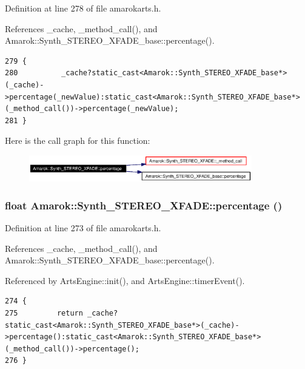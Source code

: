 Definition at line 278 of file amarokarts.h.

References \_\-cache, \_\-method\_\-call(), and Amarok::Synth\_\-STEREO\_\-XFADE\_\-base::percentage().



\footnotesize\begin{verbatim}279 {
280          _cache?static_cast<Amarok::Synth_STEREO_XFADE_base*>(_cache)->percentage(_newValue):static_cast<Amarok::Synth_STEREO_XFADE_base*>(_method_call())->percentage(_newValue);
281 }
\end{verbatim}\normalsize 


Here is the call graph for this function:\begin{figure}[H]
\begin{center}
\leavevmode
\includegraphics[width=275pt]{classAmarok_1_1Synth__STEREO__XFADE_Amarok_1_1Synth__STEREO__XFADEa16_cgraph}
\end{center}
\end{figure}
\subsubsection{\setlength{\rightskip}{0pt plus 5cm}float Amarok::Synth\_\-STEREO\_\-XFADE::percentage ()\hspace{0.3cm}{\tt  [inline]}}\label{classAmarok_1_1Synth__STEREO__XFADE_Amarok_1_1Synth__STEREO__XFADEa15}




Definition at line 273 of file amarokarts.h.

References \_\-cache, \_\-method\_\-call(), and Amarok::Synth\_\-STEREO\_\-XFADE\_\-base::percentage().

Referenced by Arts\-Engine::init(), and Arts\-Engine::timer\-Event().



\footnotesize\begin{verbatim}274 {
275         return _cache?static_cast<Amarok::Synth_STEREO_XFADE_base*>(_cache)->percentage():static_cast<Amarok::Synth_STEREO_XFADE_base*>(_method_call())->percentage();
276 }
\end{verbatim}\normalsize 


